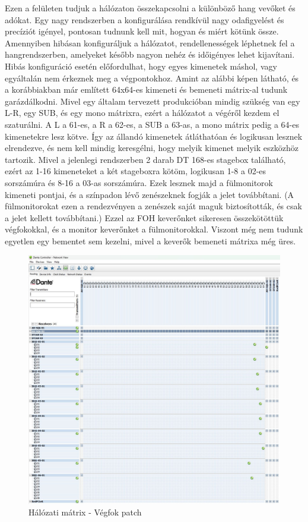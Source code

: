 Ezen a felületen tudjuk a hálózaton összekapcsolni a különböző hang vevőket és
adókat. Egy nagy rendszerben a konfigurálása rendkívül nagy odafigyelést és
precíziót igényel, pontosan tudnunk kell mit, hogyan és miért kötünk össze.
Amennyiben hibásan konfiguráljuk a hálózatot, rendellenességek léphetnek fel a
hangrendszerben, amelyeket később nagyon nehéz és időigényes lehet kijavítani.
Hibás konfiguráció esetén előfordulhat, hogy egyes kimenetek máshol, vagy egyáltalán nem érkeznek meg a
végpontokhoz. Amint az alábbi képen látható, és a korábbiakban már említett 64x64-es kimeneti és bemeneti
mátrix-al tudunk garázdálkodni. Mivel egy általam tervezett produkcióban mindig szükség van 
egy L-R, egy SUB, és egy mono mátrixra, ezért a hálózatot a végéről kezdem el szaturálni.
A L a 61-es, a R a 62-es, a SUB a 63-as, a mono mátrix pedig a 64-es kimenetekre lesz kötve.
Így az állandó kimenetek átláthatóan és logikusan lesznek elrendezve, és nem kell
mindig keresgélni, hogy melyik kimenet melyik eszközhöz tartozik.
Mivel a jelenlegi rendszerben 2 darab DT 168-es stagebox található, ezért az 
1-16 kimeneteket a két stageboxra kötöm, logikusan 1-8 a 02-es sorszámúra és 8-16 a 03-as sorszámúra.
Ezek lesznek majd a fülmonitorok kimeneti pontjai, és a színpadon lévő zenészeknek fogják a jelet továbbítani.
(A fülmonitorokat ezen a rendezvényen a zenészek saját maguk biztosították, és  csak a jelet kellett továbbítani.)
Ezzel az FOH keverőnket sikeresen összekötöttük végfokokkal, és a monitor keverőnket a fülmonitorokkal.
Viszont még nem tudunk egyetlen egy bementet sem kezelni, mivel a keverők bemeneti mátrixa még üres.
\begin{figure}[H]
	\centering
	\includegraphics[width=\textwidth, keepaspectratio]{figures/dante_pa_patch.jpg}
	\caption{Hálózati mátrix - Végfok patch}\label{fig:dante_pa_patch}
\end{figure}
